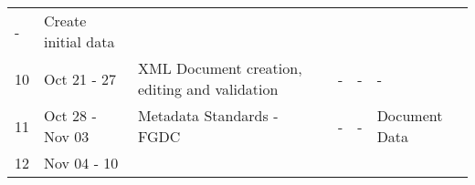 \documentclass[
]{article}
\begin{document}
\begin{longtable}[]{@{}llllll@{}}
\begin{minipage}[t]{0.14\columnwidth}
-\strut
\end{minipage} & \begin{minipage}[t]{0.17\columnwidth}\raggedright
Create initial data\strut
\end{minipage}\tabularnewline
\begin{minipage}[t]{0.05\columnwidth}\raggedright
10\strut
\end{minipage} & \begin{minipage}[t]{0.11\columnwidth}\raggedright
Oct 21 - 27\strut
\end{minipage} & \begin{minipage}[t]{0.18\columnwidth}\raggedright
XML Document creation, editing and validation\strut
\end{minipage} & \begin{minipage}[t]{0.18\columnwidth}\raggedright
-\strut
\end{minipage} & \begin{minipage}[t]{0.14\columnwidth}\raggedright
-\strut
\end{minipage} & \begin{minipage}[t]{0.17\columnwidth}\raggedright
-\strut
\end{minipage}\tabularnewline
\begin{minipage}[t]{0.05\columnwidth}\raggedright
11\strut
\end{minipage} & \begin{minipage}[t]{0.11\columnwidth}\raggedright
Oct 28 - Nov 03\strut
\end{minipage} & \begin{minipage}[t]{0.18\columnwidth}\raggedright
Metadata Standards - FGDC\strut
\end{minipage} & \begin{minipage}[t]{0.18\columnwidth}\raggedright
-\strut
\end{minipage} & \begin{minipage}[t]{0.14\columnwidth}\raggedright
-\strut
\end{minipage} & \begin{minipage}[t]{0.17\columnwidth}\raggedright
Document Data\strut
\end{minipage}\tabularnewline
\begin{minipage}[t]{0.05\columnwidth}\raggedright
12\strut
\end{minipage} & \begin{minipage}[t]{0.11\columnwidth}\raggedright
Nov 04 - 10\strut
\end{minipage} & \begin{minipage}[t]{0.18\columnwidth}\raggedright

\end{minipage}
\end{longtable}
\end{document}
